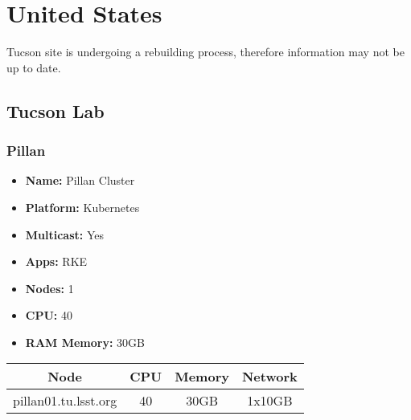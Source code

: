 \newpage
\section{United States}
\vspace*{-\baselineskip}
Tucson site is undergoing a rebuilding process, therefore information may not be up to date.
\subsection{Tucson Lab}
\subsubsection{Pillan}
\vspace*{-\baselineskip}
\begin{itemize}
  \itemsep0em 
  \item \textbf{Name:}       Pillan Cluster
  \item \textbf{Platform:}   Kubernetes
  \item \textbf{Multicast:}  Yes
  \item \textbf{Apps:}       RKE
  \item \textbf{Nodes:}      1
  \item \textbf{CPU:}        40
  \item \textbf{RAM Memory:} 30GB
\end{itemize}
\vspace*{-\baselineskip}
\begin{center}
  \small
  \begin{tabular}{||c c c c||}
    \hline
    \textbf{Node} & \textbf{CPU} & \textbf{Memory} & \textbf{Network} \\ [0.5ex]
    \hline
    pillan01.tu.lsst.org & 40 & 30GB & 1x10GB \\
    \hline
  \end{tabular}
\end{center}
\vspace*{-\baselineskip}
